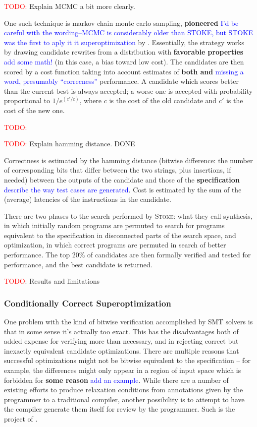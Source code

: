 \documentclass[12pt,twoside]{reedthesis}
\newcommand{\red}[1]{\textcolor{red}{#1}}
\newcommand{\comment}[2]{\textbf{#1} \textcolor{blue}{#2}}
\begin{document}
\red{TODO:} Explain MCMC a bit more clearly.

One such technique is markov chain monte carlo sampling, \comment{pioneered}{I'd be careful with the wording--MCMC is considerably older than STOKE, but STOKE was the first to aply it it superoptimization} by \cite{schkufza2013stoke}. 
Essentially, the strategy works by drawing candidate rewrites from a distribution with \comment{favorable properties}{add some math!} (in this case, a bias toward low cost).
The candidates are then scored by a cost function taking into account estimates of \comment{both and}{missing a word, presumably ``correcness''} performance.
A candidate which scores better than the current best is always accepted; a worse one is accepted with probability proportional to $1/e^(c'/c)$, where $c$ is the cost of the old candidate and $c'$ is the cost of the new one.

\red{TODO:} 

\red{TODO:} Explain hamming distance. DONE

Correctness is estimated by the hamming distance (bitwise difference: the number of corresponding bits that differ between the two strings, plus insertions, if needed) between the outputs of the candidate and those of the \comment{specification}{describe the way test cases are generated}.
Cost is estimated by the sum of the (average) latencies of the instructions in the candidate.

There are two phases to the search performed by \textsc{Stoke}:
    what they call synthesis, in which initially random programs are permuted to search for programs equivalent to the specification in disconnected parts of the search space,
    and optimization, in which correct programs are permuted in search of better performance.
The top 20\% of candidates are then formally verified and tested for performance, and the best candidate is returned.

\red{TODO}: Results and limitations

\subsubsection{Conditionally Correct Superoptimization}

One problem with the kind of bitwise verification accomplished by SMT solvers is that in some sense it's actually too exact.
This has the disadvantages both of added expense for verifying more than necessary, and in rejecting correct but inexactly equivalent candidate optimizations.
There are multiple reasons that successful optimizations might not be bitwise equivalent to the specification
    -- for example, the differences might only appear in a region of input space which is forbidden for \comment{some reason}{add an example}.
While there are a number of existing efforts to produce relaxation conditions from annotations given by the programmer to a traditional compiler, another possibility is to attempt to have the compiler generate them itself for review by the programmer.
Such is the project of \cite{sharma2015conditionally}.
    
\end{document}
